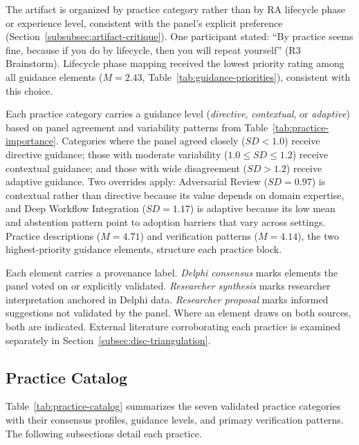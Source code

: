 The artifact is organized by practice category rather than by RA lifecycle phase
or experience level, consistent with the panel's explicit preference
(Section~\ref{subsubsec:artifact-critique}). One participant stated: ``By
practice seems fine, because if you do by lifecycle, then you will repeat
yourself'' (R3 Brainstorm). Lifecycle phase mapping received the lowest priority
rating among all guidance elements ($M = 2.43$,
Table~\ref{tab:guidance-priorities}), consistent with this choice.

Each practice category carries a guidance level (\textit{directive},
\textit{contextual}, or \textit{adaptive}) based on panel agreement and
variability patterns from Table~\ref{tab:practice-importance}. Categories where
the panel agreed closely ($SD < 1.0$) receive directive guidance; those with
moderate variability ($1.0 \leq SD \leq 1.2$) receive contextual guidance; and
those with wide disagreement ($SD > 1.2$) receive adaptive guidance. Two
overrides apply: Adversarial Review ($SD = 0.97$) is contextual rather than
directive because its value depends on domain expertise, and Deep Workflow
Integration ($SD = 1.17$) is adaptive because its low mean and abstention
pattern point to adoption barriers that vary across settings. Practice
descriptions ($M = 4.71$) and verification patterns ($M = 4.14$), the two
highest-priority guidance elements, structure each practice block.

Each element carries a provenance label. \textit{Delphi consensus} marks
elements the panel voted on or explicitly validated. \textit{Researcher
synthesis} marks researcher interpretation anchored in Delphi data.
\textit{Researcher proposal} marks informed suggestions not validated by the
panel. Where an element draws on both sources, both are indicated. External
literature corroborating each practice is examined separately in
Section~\ref{subsec:disc-triangulation}.

\subsection{Practice Catalog}\label{subsec:practice-catalog}

Table~\ref{tab:practice-catalog} summarizes the seven validated practice
categories with their consensus profiles, guidance levels, and primary
verification patterns. The following subsections detail each practice.

